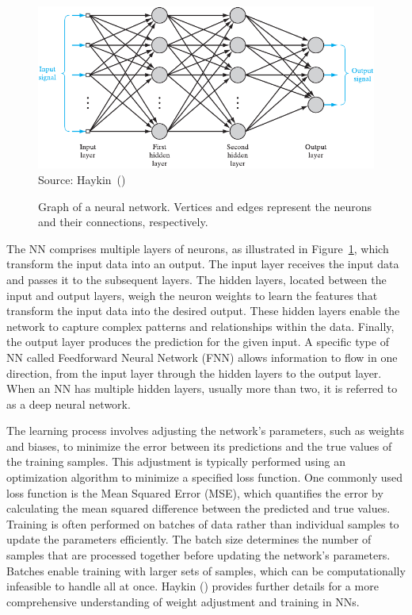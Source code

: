 \begin{figure}
    \caption[Graph of a neural network.]{Graph of a neural network. Vertices and edges represent the neurons and their connections, respectively.}
    \label{fig:neuralnetwork}
    \addvspace{\baselineskip}
    \centering
    \includegraphics[width=0.9\linewidth]{figures/network.pdf} \\
    \addvspace{\baselineskip}
    Source: Haykin~(\citeyear{Haykin/2009})
\end{figure}

The NN comprises multiple layers of neurons, as illustrated in Figure~\ref{fig:neuralnetwork}, which transform the input data into an output. The input layer receives the input data and passes it to the subsequent layers. The hidden layers, located between the input and output layers, weigh the neuron weights to learn the features that transform the input data into the desired output. These hidden layers enable the network to capture complex patterns and relationships within the data. Finally, the output layer produces the prediction for the given input. A specific type of NN called Feedforward Neural Network (FNN) allows information to flow in one direction, from the input layer through the hidden layers to the output layer. When an NN has multiple hidden layers, usually more than two, it is referred to as a deep neural network.

The learning process involves adjusting the network's parameters, such as weights and biases, to minimize the error between its predictions and the true values of the training samples. This adjustment is typically performed using an optimization algorithm to minimize a specified loss function. One commonly used loss function is the Mean Squared Error (MSE), which quantifies the error by calculating the mean squared difference between the predicted and true values. Training is often performed on batches of data rather than individual samples to update the parameters efficiently. The batch size determines the number of samples that are processed together before updating the network's parameters. Batches enable training with larger sets of samples, which can be computationally infeasible to handle all at once. Haykin (\citeyear{Haykin/2009}) provides further details for a more comprehensive understanding of weight adjustment and training in NNs.

